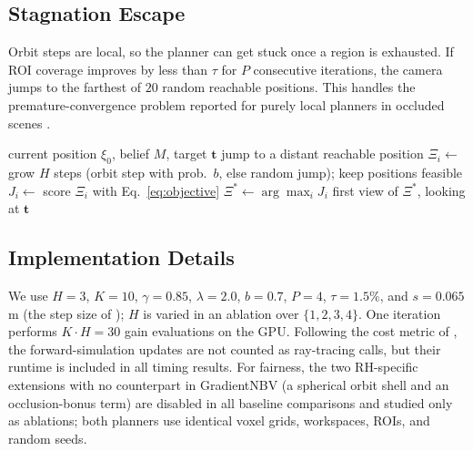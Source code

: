 \subsection{Stagnation Escape}
\label{sec:method-stagnation}

Orbit steps are local, so the planner can get stuck once a region is
exhausted. If ROI coverage improves by less than $\tau$ for $P$
consecutive iterations, the camera jumps to the farthest of $20$ random
reachable positions. This handles the premature-convergence problem
reported for purely local planners in occluded scenes
\cite{verlinden2024pso}.

\begin{algorithm}[t]
\caption{RH--NBV: one planning iteration}
\label{alg:rh}
\begin{algorithmic}[1]
\Require current position $\xi_0$, belief $M$, target $\mathbf{t}$
    \State jump to a distant reachable position
\EndIf
{}
    \State $\Xi_i \gets$ grow $H$ steps (orbit step with prob.~$b$,
           else random jump); keep positions feasible
    \State $J_i \gets$ score $\Xi_i$ with Eq.~\eqref{eq:objective}
\EndFor
\State $\Xi^{*} \gets \arg\max_i J_i$
\State \Return first view of $\Xi^{*}$, looking at $\mathbf{t}$
\end{algorithmic}
\end{algorithm}

\subsection{Implementation Details}
\label{sec:method-implementation}

We use $H{=}3$, $K{=}10$, $\gamma{=}0.85$, $\lambda{=}2.0$, $b{=}0.7$,
$P{=}4$, $\tau{=}1.5\%$, and $s{=}0.065$\,m (the step size of
\cite{burusa2024}); $H$ is varied in an ablation over $\{1,2,3,4\}$.
One iteration performs $K \cdot H = 30$ gain evaluations on the GPU.
Following the cost metric of \cite{burusa2024}, the forward-simulation
updates are not counted as ray-tracing calls, but their runtime is
included in all timing results. For fairness, the two RH-specific
extensions with no counterpart in GradientNBV (a spherical orbit shell
and an occlusion-bonus term) are disabled in all baseline comparisons
and studied only as ablations; both planners use identical voxel grids,
workspaces, ROIs, and random seeds.
